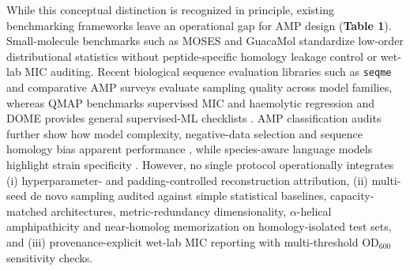 \documentclass[unnumsec,webpdf,contemporary,large]{oup-authoring-template}
\newcommand{\rev}[1]{#1}
\begin{document}
\rev{While this conceptual distinction is recognized in principle, existing benchmarking frameworks leave an operational gap for AMP design (\textbf{Table 1}). Small-molecule benchmarks such as MOSES \cite{ref26} and GuacaMol \cite{ref28} standardize low-order distributional statistics without peptide-specific homology leakage control or wet-lab MIC auditing. Recent biological sequence evaluation libraries such as \texttt{seqme} \cite{ref29} and comparative AMP surveys \cite{ref8} evaluate sampling quality across model families, whereas QMAP \cite{ref13} benchmarks supervised MIC and haemolytic regression and DOME \cite{ref43} provides general supervised-ML checklists \cite{ref44,ref45}. AMP classification audits further show how model complexity, negative-data selection and sequence homology bias apparent performance \cite{refXu2021,ref4,ref5,ref39,ref40}, while species-aware language models highlight strain specificity \cite{refLLAMP}. However, no single protocol operationally integrates (i) hyperparameter- and padding-controlled reconstruction attribution, (ii) multi-seed de novo sampling audited against simple statistical baselines, capacity-matched architectures, metric-redundancy dimensionality, $\alpha$-helical amphipathicity and near-homolog memorization on homology-isolated test sets, and (iii) provenance-explicit wet-lab MIC reporting with multi-threshold OD$_{600}$ sensitivity checks.}
\end{document}
